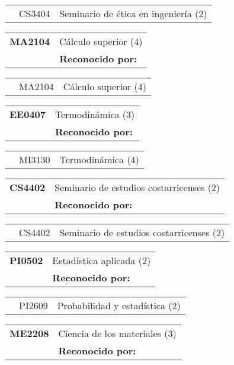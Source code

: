 \documentclass[letterpaper]{article}%
\begin{document}
\begin{tabularx}{\textwidth}{p{1.5cm}p{1.5cm}p{10cm}}%
&CS3404&Seminario de ética en ingeniería (2)\\%
\end{tabularx}%
\begin{tabularx}{\textwidth}{p{1.5cm}p{10cm}}%
\textbf{MA2104}&Cálculo superior (4)\\%
&\textbf{Reconocido por: }\\%
\end{tabularx}%
\begin{tabularx}{\textwidth}{p{1.5cm}p{1.5cm}p{10cm}}%
&MA2104&Cálculo superior (4)\\%
\end{tabularx}%
\begin{tabularx}{\textwidth}{p{1.5cm}p{10cm}}%
\textbf{EE0407}&Termodinámica (3)\\%
&\textbf{Reconocido por: }\\%
\end{tabularx}%
\begin{tabularx}{\textwidth}{p{1.5cm}p{1.5cm}p{10cm}}%
&MI3130&Termodinámica (4)\\%
\end{tabularx}%
\begin{tabularx}{\textwidth}{p{1.5cm}p{10cm}}%
\textbf{CS4402}&Seminario de estudios costarricenses (2)\\%
&\textbf{Reconocido por: }\\%
\end{tabularx}%
\begin{tabularx}{\textwidth}{p{1.5cm}p{1.5cm}p{10cm}}%
&CS4402&Seminario de estudios costarricenses (2)\\%
\end{tabularx}%
\begin{tabularx}{\textwidth}{p{1.5cm}p{10cm}}%
\textbf{PI0502}&Estadística aplicada (2)\\%
&\textbf{Reconocido por: }\\%
\end{tabularx}%
\begin{tabularx}{\textwidth}{p{1.5cm}p{1.5cm}p{10cm}}%
&PI2609&Probabilidad y estadística (2)\\%
\end{tabularx}%
\begin{tabularx}{\textwidth}{p{1.5cm}p{10cm}}%
\textbf{ME2208}&Ciencia de los materiales (3)\\%
&\textbf{Reconocido por: }\\%
\end{tabularx}%
\end{document}
